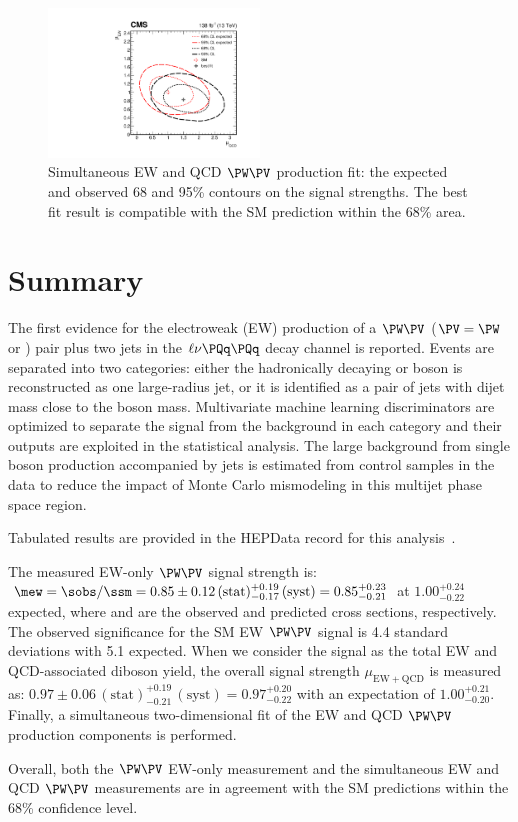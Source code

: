 \begin{figure}[!htb]
  \centering \includegraphics[width=0.5\textwidth]{Images/VBS_Studies/Figure_006.pdf} \caption{Simultaneous EW and QCD $\PW\PV$ production
    fit: the expected and observed 68 and 95\% \CL contours on the signal strengths. The best fit result is compatible
    with the SM prediction within the 68\% \CL area.  } \label{fig:fit_2d}
\end{figure}


\section{Summary}\label{sec:9}

The first evidence for the electroweak (EW) production of a $\PW\PV$ ($\PV = \PW$ or {\PZ}) pair plus two jets in the
$\ell\nu\PQq\PQq$ decay channel is reported.  Events are separated into two categories: either the hadronically decaying
{\PW} or {\PZ} boson is reconstructed as one large-radius jet, or it is identified as a pair of jets with dijet mass
close to the boson mass.  Multivariate machine learning discriminators are optimized to separate the signal from the
background in each category and their outputs are exploited in the statistical analysis.  The large background from
single {\PW} boson production accompanied by jets is estimated from control samples in the data to reduce the impact of
Monte Carlo mismodeling in this multijet phase space region.

Tabulated results are provided in the HEPData record for this analysis~\cite{HEPData}.

The measured EW-only $\PW\PV$ signal strength is:
$\mew = \sobs / \ssm = 0.85\pm0.12\,(\text{stat})^{+0.19}_{-0.17}\,(\text{syst}) = 0.85 ^{+0.23}_{-0.21} $
at $1.00^{+0.24}_{-0.22}$ expected, where \sobs and \ssm are the observed and predicted cross sections, respectively.
The observed significance for the SM EW $\PW\PV$ signal is 4.4 standard deviations with 5.1 expected.
When we consider the signal as the total EW and QCD-associated diboson yield, the overall signal strength
$\mu_{\mathrm{EW}+\mathrm{QCD}}$ is measured as: $0.97\pm0.06\,(\text{stat})^{+0.19}_{-0.21}\,(\text{syst}) = 0.97
^{+0.20}_{-0.22}$ with an expectation of $1.00^{+0.21}_{-0.20}$.  Finally, a simultaneous two-dimensional fit of the EW
and QCD $\PW\PV$ production components is performed.

Overall, both the $\PW\PV$ EW-only measurement and the simultaneous EW and QCD $\PW\PV$ measurements are in agreement
with the SM predictions within the 68\% confidence level.
